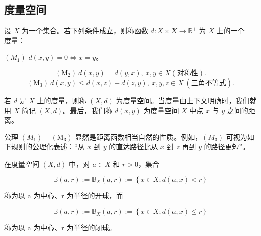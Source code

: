 \subsection*{度量空间}

设 $X$ 为一个集合。若下列条件成立，则称函数 $d: X \times X \to \mathbb{R}^+$ 为 $X$ 上的一个 $\mathbf{度量}$：

$ (M_1) $  $ d(x, y) = 0 \Leftrightarrow x = y $。

\[
(\mathrm{M}_{2})~d(x,y)=d(y,x),~x,y\in X(\text{对称性}).
\]
\[
\mathrm{(M_{3})}\ d(x,y)\leq d(x,z)+d(z,y),\ x,y,z\in X\ (\text{三角不等式}).
\]

若 $d$ 是 $X$ 上的度量，则称 $(X,d)$ 为度量空间。当度量由上下文明确时，我们就用 $X$ 简记 $(X,d)$。最后，我们称 $d(x,y)$ 为度量空间 $X$ 中点 $x$ 与 $y$ 之间的距离。

公理 $(M_{1})-(\mathrm{M}_{3})$ 显然是距离函数相当自然的性质。例如，$(M_{3})$ 可视为如下规则的公理化表述：“从 $x$ 到 $y$ 的直达路径比从 $x$ 到 $z$ 再到 $y$ 的路径更短”。

在度量空间  $ (X, d) $ 中，对  $ a \in X $ 和  $ r > 0 $，集合

\[
\mathbb{B}(a,r):=\mathbb{B}_{X}(a,r):=\left\{x\in X;d(a,x)<r\right\}
\]

称为以 a 为中心、r 为半径的开球，而

\[
\bar{\mathbb{B}}(a,r):=\bar{\mathbb{B}}_{X}(a,r):=\left\{x\in X;d(a,x)\leq r\right\}
\]

称为以 a 为中心、r 为半径的闭球。

